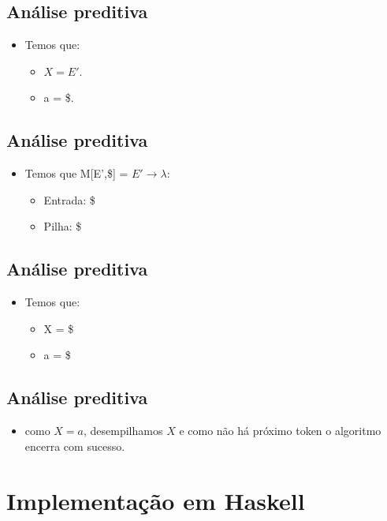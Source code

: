 \documentclass[11pt]{article}
\begin{document}
\subsection*{Análise preditiva}
\label{sec:org5a3d0d8}

\begin{itemize}
\item Temos que:
\begin{itemize}
\item \(X = E'\).
\item a = \$.
\end{itemize}
\end{itemize}
\subsection*{Análise preditiva}
\label{sec:org4bc21da}

\begin{itemize}
\item Temos que M[E',\$] = \(E'\to\lambda\):
\begin{itemize}
\item Entrada: \$
\item Pilha: \$
\end{itemize}
\end{itemize}
\subsection*{Análise preditiva}
\label{sec:orgc09f32f}

\begin{itemize}
\item Temos que:
\begin{itemize}
\item X = \$
\item a = \$
\end{itemize}
\end{itemize}
\subsection*{Análise preditiva}
\label{sec:org583e310}

\begin{itemize}
\item como \(X = a\), desempilhamos \(X\) e como não há próximo token o algoritmo encerra com sucesso.
\end{itemize}
\section*{Implementação em Haskell}
\label{sec:org0b3d798}
\end{document}
